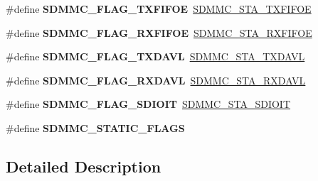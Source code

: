 \begin{DoxyCompactItemize}
\item 
\mbox{\label{group___s_d_m_m_c___l_l___flags_ga29c20828a520bab833586804193e32f5}} 
\#define {\bfseries S\+D\+M\+M\+C\+\_\+\+F\+L\+A\+G\+\_\+\+T\+X\+F\+I\+F\+OE}~\mbox{\hyperlink{group___peripheral___registers___bits___definition_gaae8a094d8aec9a4bd0e0518cfd0c758f}{S\+D\+M\+M\+C\+\_\+\+S\+T\+A\+\_\+\+T\+X\+F\+I\+F\+OE}}
\item 
\mbox{\label{group___s_d_m_m_c___l_l___flags_ga1939566681bcd351a5c2d1192098a12a}} 
\#define {\bfseries S\+D\+M\+M\+C\+\_\+\+F\+L\+A\+G\+\_\+\+R\+X\+F\+I\+F\+OE}~\mbox{\hyperlink{group___peripheral___registers___bits___definition_ga3993acde757e2b254ae14d3b15cda2fa}{S\+D\+M\+M\+C\+\_\+\+S\+T\+A\+\_\+\+R\+X\+F\+I\+F\+OE}}
\item 
\mbox{\label{group___s_d_m_m_c___l_l___flags_gaf4941c0cb9ac2b2ba0201eeae5272405}} 
\#define {\bfseries S\+D\+M\+M\+C\+\_\+\+F\+L\+A\+G\+\_\+\+T\+X\+D\+A\+VL}~\mbox{\hyperlink{group___peripheral___registers___bits___definition_ga29e69944dcbe2004de5079de2a49d1a3}{S\+D\+M\+M\+C\+\_\+\+S\+T\+A\+\_\+\+T\+X\+D\+A\+VL}}
\item 
\mbox{\label{group___s_d_m_m_c___l_l___flags_ga93ebd4a087992e23b1313a6d41274912}} 
\#define {\bfseries S\+D\+M\+M\+C\+\_\+\+F\+L\+A\+G\+\_\+\+R\+X\+D\+A\+VL}~\mbox{\hyperlink{group___peripheral___registers___bits___definition_gaddd70e83dc5be9b22fc04f9a2c84313c}{S\+D\+M\+M\+C\+\_\+\+S\+T\+A\+\_\+\+R\+X\+D\+A\+VL}}
\item 
\mbox{\label{group___s_d_m_m_c___l_l___flags_ga707e3787d4eb18c2b88e13bec6476416}} 
\#define {\bfseries S\+D\+M\+M\+C\+\_\+\+F\+L\+A\+G\+\_\+\+S\+D\+I\+O\+IT}~\mbox{\hyperlink{group___peripheral___registers___bits___definition_ga7a7e34b8909f8c570efdd57ef929508e}{S\+D\+M\+M\+C\+\_\+\+S\+T\+A\+\_\+\+S\+D\+I\+O\+IT}}
\item 
\#define {\bfseries S\+D\+M\+M\+C\+\_\+\+S\+T\+A\+T\+I\+C\+\_\+\+F\+L\+A\+GS}
\end{DoxyCompactItemize}


\subsection{Detailed Description}


